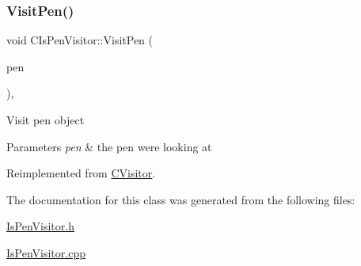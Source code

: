 \subsubsection{\texorpdfstring{VisitPen()}{VisitPen()}}
{\footnotesize\ttfamily void C\+Is\+Pen\+Visitor\+::\+Visit\+Pen (\begin{DoxyParamCaption}\item[{\mbox{\hyperlink{class_c_pens}{C\+Pens}} $\ast$}]{pen }\end{DoxyParamCaption})\hspace{0.3cm}{\ttfamily [override]}, {\ttfamily [virtual]}}

Visit pen object 
\begin{DoxyParams}{Parameters}
{\em pen} & the pen we\textquotesingle{}re looking at \\
\hline
\end{DoxyParams}


Reimplemented from \mbox{\hyperlink{class_c_visitor_ab4ba1c148a5672a48a40596e9ac5a72c}{C\+Visitor}}.



The documentation for this class was generated from the following files\+:\begin{DoxyCompactItemize}
\item 
\mbox{\hyperlink{_is_pen_visitor_8h}{Is\+Pen\+Visitor.\+h}}\item 
\mbox{\hyperlink{_is_pen_visitor_8cpp}{Is\+Pen\+Visitor.\+cpp}}\end{DoxyCompactItemize}
